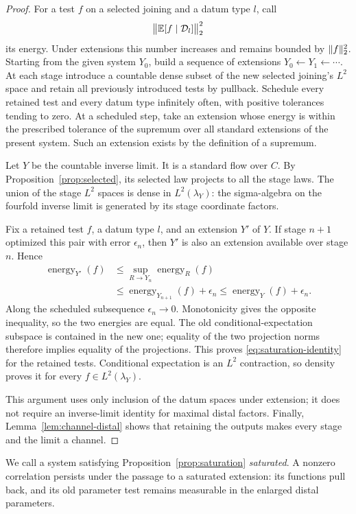 \begin{proof}
For a test $f$ on a selected joining and a datum type $l$, call
\[
 \bigl\|\mathbb E[f\mid\mathcal D_l]\bigr\|_2^2
\]
its energy. Under extensions this number increases and remains bounded
by $\lVert f\rVert_2^2$. Starting from the given system $Y_0$, build a sequence
of extensions $Y_0\leftarrow Y_1\leftarrow\cdots$. At each stage
introduce a countable dense subset of the
new selected joining's $L^2$ space and retain all previously introduced
tests by pullback. Schedule every retained test and every datum type
infinitely often, with positive tolerances tending to zero. At a
scheduled step, take an extension whose energy is within the prescribed
tolerance of the supremum over all standard extensions of the present
system. Such an extension exists by the definition of a supremum.

Let $Y$ be the countable inverse limit. It is a standard flow over $C$.
By Proposition~\ref{prop:selected}, its selected law projects to all
the stage laws. The union of the stage $L^2$ spaces is dense in
$L^2(\lambda_Y)$: the sigma-algebra on the fourfold inverse limit is
generated by its stage coordinate factors.

Fix a retained test $f$, a datum type $l$, and an extension $Y'$ of
$Y$. If stage $n+1$ optimized this pair with error $\epsilon_n$, then
$Y'$ is also an extension available over stage $n$. Hence
\begin{align*}
 \operatorname{energy}_{Y'}(f)
 &\le\sup_{R\to Y_n}\operatorname{energy}_{R}(f)\\
 &\le\operatorname{energy}_{Y_{n+1}}(f)+\epsilon_n
 \le\operatorname{energy}_{Y}(f)+\epsilon_n.
\end{align*}
Along the scheduled subsequence $\epsilon_n\to0$. Monotonicity gives
the opposite inequality, so the two energies are equal. The old
conditional-expectation subspace is contained in the new one; equality
of the two projection norms therefore implies equality of the
projections. This proves \eqref{eq:saturation-identity} for the retained
tests. Conditional expectation is an $L^2$ contraction, so density
proves it for every $f\in L^2(\lambda_Y)$.

This argument uses only inclusion of the datum spaces under extension;
it does not require an inverse-limit identity for maximal distal
factors. Finally, Lemma~\ref{lem:channel-distal} shows that retaining
the outputs makes every stage and the limit a channel.
\end{proof}

We call a system satisfying Proposition~\ref{prop:saturation}
\emph{saturated}. A nonzero correlation persists under the passage to
a saturated extension: its functions pull back, and its old parameter
test remains measurable in the enlarged distal parameters.

